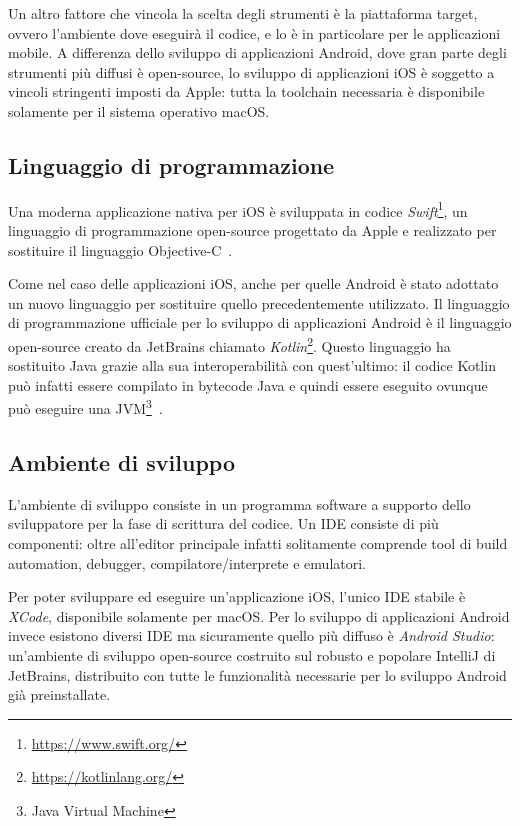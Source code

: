 Un altro fattore che vincola la scelta degli strumenti è la piattaforma target,
ovvero l'ambiente dove eseguirà il codice,
e lo è in particolare per le applicazioni mobile. 
A differenza dello sviluppo di applicazioni Android,
dove gran parte degli strumenti più diffusi è open-source, 
lo sviluppo di applicazioni iOS è soggetto a vincoli stringenti imposti da Apple: 
tutta la toolchain necessaria è disponibile solamente per il sistema operativo macOS.

\subsection*{Linguaggio di programmazione}
Una moderna applicazione nativa per iOS è sviluppata in codice \textit{Swift}\footnote{\href{https://www.swift.org/}{https://www.swift.org/}}, 
un linguaggio di programmazione open-source progettato da Apple e realizzato per sostituire il linguaggio Objective-C~\cite{kerr2018beginning}.

Come nel caso delle applicazioni iOS,
anche per quelle Android è stato adottato un nuovo linguaggio per sostituire quello precedentemente utilizzato. 
Il linguaggio di programmazione ufficiale per lo sviluppo di applicazioni Android è il linguaggio open-source creato da JetBrains chiamato \textit{Kotlin}\footnote{\href{https://kotlinlang.org/}{https://kotlinlang.org/}}. 
Questo linguaggio ha sostituito Java grazie alla sua interoperabilità con quest'ultimo: 
il codice Kotlin può infatti essere compilato in bytecode Java e quindi essere eseguito ovunque può eseguire una JVM\footnote{Java Virtual Machine}~\cite{laurence2021programming}.

\subsection*{Ambiente di sviluppo}
L'ambiente di sviluppo consiste in un programma software a supporto dello sviluppatore per la fase di scrittura del codice. 
Un IDE consiste di più componenti: 
oltre all'editor principale infatti solitamente comprende tool di build automation, 
debugger, 
compilatore/interprete e emulatori.

Per poter sviluppare ed eseguire un'applicazione iOS,
l'unico IDE stabile è \textit{XCode}, 
disponibile solamente per macOS. 
Per lo sviluppo di applicazioni Android invece esistono diversi IDE ma sicuramente quello più diffuso è \textit{Android Studio}:
un'ambiente di sviluppo open-source costruito sul robusto e popolare IntelliJ di JetBrains,
distribuito con tutte le funzionalità necessarie per lo sviluppo Android già preinstallate.

